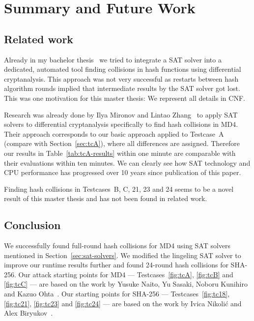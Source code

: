 \renewcommand*\chappic{}
\renewcommand*\chapquote{}
\chapter{Summary and Future Work}
\label{ch:summary}
%
\section{Related work}
\label{sec:results-related}
%
Already in my bachelor thesis~\cite{bach} we tried to integrate a SAT solver into
a dedicated, automated tool finding collisions in hash functions using differential
cryptanalysis. This approach was not very successful as restarts between hash
algorithm rounds implied that intermediate results by the SAT solver got lost.
This was one motivation for this master thesis: We represent all details in CNF.

Research was already done by Ilya Mironov and Lintao Zhang~\cite{mironov2006applications}
to apply SAT solvers to differential cryptanalysis specifically to find hash collisions
in MD4. Their approach corresponds to our basic approach applied to Testcase~A
(compare with Section~\ref{sec:tcA}), where all differences are assigned.
Therefore our results in Table~\ref{tab:tcA-results} within one minute are
comparable with their evaluations within ten minutes.
We can clearly see how SAT technology and CPU performance
has progressed over 10 years since publication of this paper.

Finding hash collisions in Testcases~B, C, 21, 23 and 24 seems
to be a novel result of this master thesis and has not been found
in related work.

\section{Conclusion}
\label{sec:conclusion}
%
We successfully found full-round hash collisions for MD4
using SAT solvers mentioned in Section~\ref{sec:sat-solvers}.
We modified the lingeling SAT solver to improve our
runtime results further and found 24-round hash collisions
for SHA-256. Our attack starting points for MD4 ---
Testcases~\ref{fig:tcA}, \ref{fig:tcB} and \ref{fig:tcC} ---
are based on the work by Yusuke Naito, Yu Sasaki, Noboru Kunihiro and
Kazuo Ohta~\cite{sasaki2007new}. Our starting points for SHA-256
--- Testcases~\ref{fig:tc18}, \ref{fig:tc21}, \ref{fig:tc23}
and \ref{fig:tc24} --- are based on the work by Ivica Nikoli{\'c}
and Alex Biryukov~\cite{nikolic2008collisions}.

